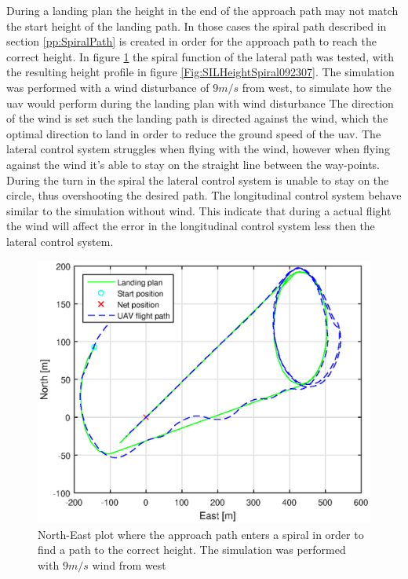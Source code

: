 During a landing plan the height in the end of the approach path may not match the start height of the landing path. In those cases the spiral path described in section \ref{pp:SpiralPath} is created in order for the approach path to reach the correct height. In figure \ref{Fig:SILNorthEastSpiral092307} the spiral function of the lateral path was tested, with the resulting height profile in figure \ref{Fig:SILHeightSpiral092307}. The simulation was performed with a wind disturbance of $9 m/s$ from west, to simulate how the \gls{uav} would perform during the landing plan with wind disturbance The direction of the wind is set such the landing path is directed against the wind, which the optimal direction to land in order to reduce the ground speed of the \gls{uav}. The lateral control system struggles when flying with the wind, however when flying against the wind it's able to stay on the straight line between the way-points. During the turn in the spiral the lateral control system is unable to stay on the circle, thus overshooting the desired path. The longitudinal control system behave similar to the simulation without wind. This indicate that during a actual flight the wind will affect the error in the longitudinal control system less then the lateral control system. 
\begin{figure}[H]
\centering
\includegraphics[scale=0.7]{figs/SysPlot/SILNorthEast6juni092307.eps}
\caption{North-East plot where the approach path enters a spiral in order to find a path to the correct height. The simulation was performed with $9 m/s$ wind from west}
\label{Fig:SILNorthEastSpiral092307}
\end{figure}
